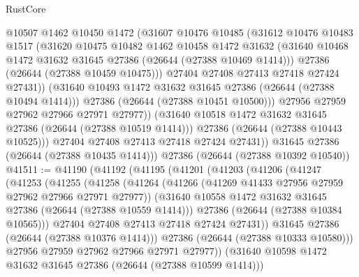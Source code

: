 \begin{lexlean}{RustCore}
\begin{coremodule}
                  @10507
                  @1462
                  @10450
                  @1472
                  (@31607
                    @10476
                    @10485
                    (@31612
                      @10476
                      @10483
                      @1517
                      (@31620
                        @10475
                        @10482
                        @1462
                        @10458
                        @1472
                        @31632
                        (@31640 @10468 @1472 @31632 @31645 @27386 (@26644 (@27388 @10469 @1414)))
                        @27386
                        (@26644 (@27388 @10459 @10475)))
                      @27404
                      @27408
                      @27413
                      @27418
                      @27424
                      @27431))
                  (@31640 @10493 @1472 @31632 @31645 @27386 (@26644 (@27388 @10494 @1414)))
                  @27386
                  (@26644 (@27388 @10451 @10500)))
                @27956
                @27959
                @27962
                @27966
                @27971
                @27977))
            (@31640 @10518 @1472 @31632 @31645 @27386 (@26644 (@27388 @10519 @1414)))
            @27386
            (@26644 (@27388 @10443 @10525)))
          @27404
          @27408
          @27413
          @27418
          @27424
          @27431))
      @31645
      @27386
      (@26644 (@27388 @10435 @1414)))
    @27386
    (@26644 (@27388 @10392 @10540))
@41511 := @41190
    (@41192
      (@41195
        (@41201
          (@41203
            (@41206
              (@41247
                (@41253
                  (@41255
                    (@41258
                      (@41264
                        (@41266 (@41269 @41433 @27956 @27959 @27962 @27966 @27971 @27977))
                        (@31640 @10558 @1472 @31632 @31645 @27386 (@26644 (@27388 @10559 @1414)))
                        @27386
                        (@26644 (@27388 @10384 @10565)))
                      @27404
                      @27408
                      @27413
                      @27418
                      @27424
                      @27431))
                  @31645
                  @27386
                  (@26644 (@27388 @10376 @1414)))
                @27386
                (@26644 (@27388 @10333 @10580)))
              @27956
              @27959
              @27962
              @27966
              @27971
              @27977))
          (@31640 @10598 @1472 @31632 @31645 @27386 (@26644 (@27388 @10599 @1414)))

\end{coremodule}
\end{lexlean}
